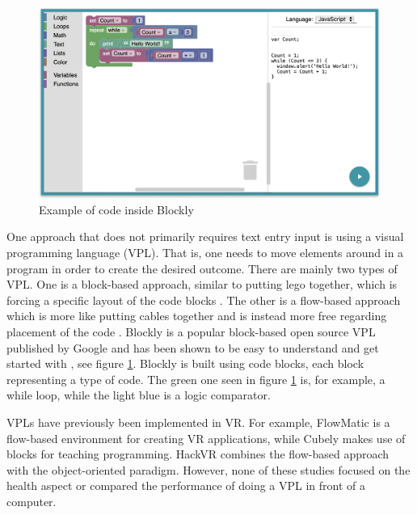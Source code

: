 \documentclass[screen, sigcconf]{timtm}
\begin{document}
\begin{figure}[h]
  \includegraphics[width=\linewidth]{figures/blockly.png}
  \caption{Example of code inside Blockly}
  \label{fig:blockly}
\end{figure}

One approach that does not primarily requires text entry input is using a visual programming language (VPL). That is, one needs to move elements around in a program in order to create the desired outcome. There are mainly two types of VPL. One is a block-based approach, similar to putting lego together, which is forcing a specific layout of the code blocks \cite{mason_block-based_2017}. The other is a flow-based approach which is more like putting cables together and is instead more free regarding placement of the code \cite{mason_block-based_2017}. Blockly is a popular block-based open source VPL published by Google and has been shown to be easy to understand and get started with \cite{seraj_scratch_2019}, see figure \ref{fig:blockly}. Blockly is built using code blocks, each block representing a type of code. The green one seen in figure \ref{fig:blockly} is, for example, a while loop, while the light blue is a logic comparator.

VPLs have previously been implemented in VR. For example, FlowMatic \cite{zhang_flowmatic_2020} is a flow-based environment for creating VR applications, while Cubely \cite{vincur_cubely_2017} makes use of blocks for teaching programming. HackVR \cite{kao_hackvr_2020} combines the flow-based approach with the object-oriented paradigm. However, none of these studies focused on the health aspect or compared the performance of doing a VPL in front of a computer.
\end{document}
